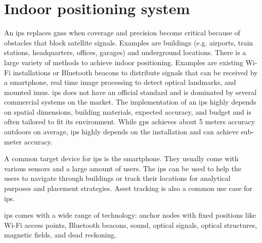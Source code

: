 \section{Indoor positioning system}
\label{sec:ips}

An \gls{ips} replaces \gls{gnss} when coverage and precision become critical because of obstacles that block satellite signals. Examples are buildings (e.g. airports, train stations, headquarters, offices, garages) and underground locations. There is a large variety of methods to achieve indoor positioning. Examples are existing Wi-Fi installations or Bluetooth beacons to distribute signals that can be received by a smartphone, real time image processing to detect optical landmarks, and mounted \glspl{imu}. \gls{ips} does not have an official standard and is dominated by several commercial systems on the market. The implementation of an \gls{ips} highly depends on spatial dimensions, building materials, expected accuracy, and budget and is often tailored to fit its environment. While \gls{gps} achieves about 5 meters accuracy outdoors on average, \gls{ips} highly depends on the installation and can achieve sub-meter accuracy.

A common target device for \gls{ips} is the smartphone. They usually come with various sensors and a large amount of users. The \gls{ips} can be used to help the users to navigate through buildings or track their locations for analytical purposes and placement strategies. Asset tracking is also a common use case for \gls{ips}.

\gls{ips} comes with a wide range of technology: anchor nodes with fixed positions like Wi-Fi access points, Bluetooth beacons, sound, optical signals, optical structures, magnetic fields, and dead reckoning.
